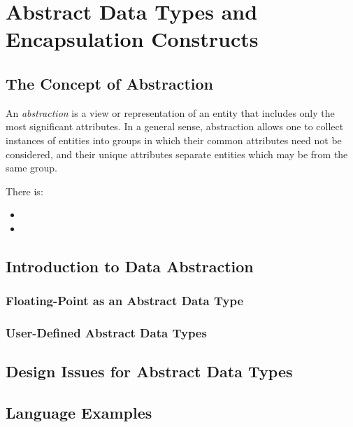\section{Abstract Data Types and Encapsulation Constructs}\label{sec:Abstract_Data_Types_Encapsulation_Constructs}
\subsection{The Concept of Abstraction}\label{subsec:Concept_Abstraction}
\begin{definition}[Abstraction]\label{def:Abstraction}
  An \emph{abstraction} is a view or representation of an entity that includes only the most significant attributes.
  In a general sense, abstraction allows one to collect instances of entities into groups in which their common attributes need not be considered, and their unique attributes separate entities which may be from the same group.

  There is:
  \begin{itemize}[noitemsep]
  \item {}
  \item {}
  \end{itemize}
\end{definition}

\subsection{Introduction to Data Abstraction}\label{subsec:Intro_Data_Abstraction}
\subsubsection{Floating-Point as an Abstract Data Type}\label{subsubsec:Floating_Point_Abstract_Data_Type}
\subsubsection{User-Defined Abstract Data Types}\label{subsubsec:User_Defined_Abstract_Data_Types}

\subsection{Design Issues for Abstract Data Types}\label{subsec:Abstract_Data_Type_Design_Issues}

\subsection{Language Examples}\label{subsec:Abstract_Data_Type_Lang_Examples}
